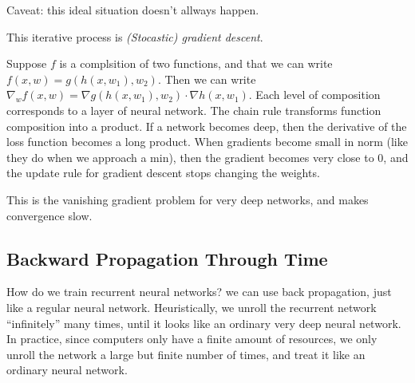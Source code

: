 \documentclass[10pt]{amsart}
\theoremstyle{definition}
\begin{document}
Caveat: this ideal situation doesn't allways happen.

This iterative process is {\em (Stocastic) gradient descent}.

Suppose $f$ is a complsition of two functions, and that we can write $f(x,w)= g(h(x, w_1), w_2)$.
Then we can write $\nabla_w f(x, w)=\nabla g(h(x, w_1), w_2)\cdot \nabla h(x, w_1)$. Each level
of composition corresponds to a layer of neural network.  The chain rule transforms function composition
into a product. If a network becomes deep, then the derivative of the loss function becomes a long
product.  When gradients become small in norm (like they do when we approach a min), then the gradient
becomes very close to $0$, and the update rule for gradient descent stops changing the weights.

This is the vanishing gradient problem for very deep networks, and makes convergence slow.


\subsection{Backward Propagation Through Time}
How do we train recurrent neural networks? we can use back propagation, just like a regular neural network. Heuristically, we unroll the recurrent network ``infinitely'' many times, until it looks like an ordinary very deep neural network.  In practice, since computers only have a finite amount of resources, we only unroll the network a large but finite number of times, and treat it like an ordinary neural network.
\end{document}

